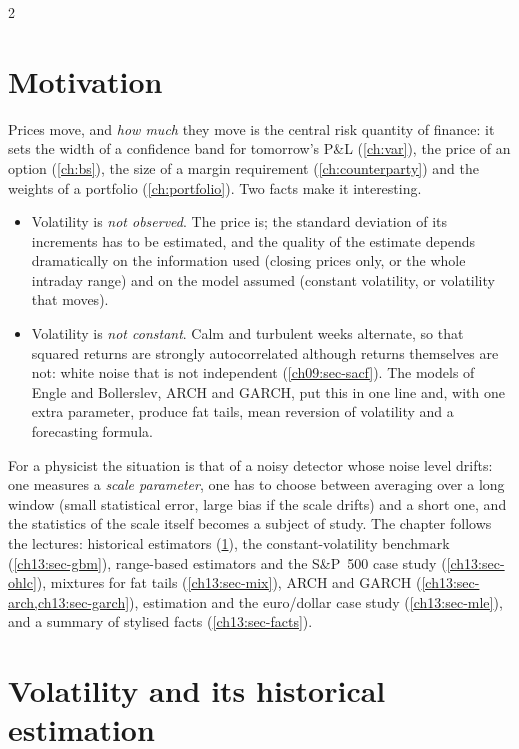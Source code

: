 \begin{paracol}{2}
\section*{Motivation}
Prices move, and \emph{how much} they move is the central risk quantity of finance: it sets the width of a confidence
band for tomorrow's P\&L (\cref{ch:var}), the price of an option (\cref{ch:bs}), the size of a margin
requirement (\cref{ch:counterparty}) and the weights of a portfolio (\cref{ch:portfolio}). Two facts make it
interesting.
\begin{itemize}
  \item Volatility is \emph{not observed}. The price is; the standard deviation of its increments has to be estimated,
        and the quality of the estimate depends dramatically on the information used (closing prices only, or the
        whole intraday range) and on the model assumed (constant volatility, or volatility that moves).
  \item Volatility is \emph{not constant}. Calm and turbulent weeks alternate, so that squared returns are strongly
        autocorrelated although returns themselves are not: white noise that is not independent
        (\cref{ch09:sec-sacf}). The models of Engle and Bollerslev, ARCH and GARCH, put this in one line and, with
        one extra parameter, produce fat tails, mean reversion of volatility and a forecasting formula.
\end{itemize}
For a physicist the situation is that of a noisy detector whose noise level drifts: one measures a
\emph{scale parameter}, one has to choose between averaging over a long window (small statistical error, large
bias if the scale drifts) and a short one, and the statistics of the scale itself becomes a subject of
study. The chapter follows the lectures: historical estimators (\cref{ch13:sec-hist}), the constant-volatility
benchmark (\cref{ch13:sec-gbm}), range-based estimators and the S\&P~500 case study (\cref{ch13:sec-ohlc}),
mixtures for fat tails (\cref{ch13:sec-mix}), ARCH and GARCH (\cref{ch13:sec-arch,ch13:sec-garch}), estimation and the
euro/dollar case study (\cref{ch13:sec-mle}), and a summary of stylised facts (\cref{ch13:sec-facts}).

\section{Volatility and its historical estimation}\label{ch13:sec-hist}


\end{paracol}
